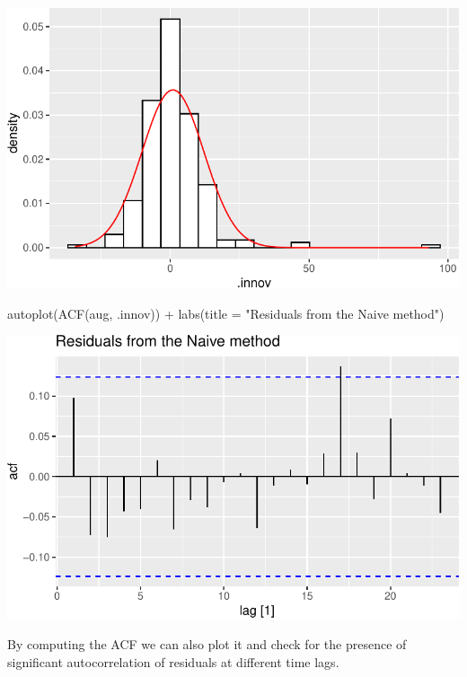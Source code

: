 \documentclass[
  letterpaper,
  DIV=11,
  numbers=noendperiod]{scrartcl}
\newenvironment{Shaded}{\begin{snugshade}}{\end{snugshade}}
\newcommand{\AttributeTok}[1]{\textcolor[rgb]{0.40,0.45,0.13}{#1}}
\newcommand{\FunctionTok}[1]{\textcolor[rgb]{0.28,0.35,0.67}{#1}}
\newcommand{\NormalTok}[1]{\textcolor[rgb]{0.00,0.23,0.31}{#1}}
\newcommand{\SpecialCharTok}[1]{\textcolor[rgb]{0.37,0.37,0.37}{#1}}
\newcommand{\StringTok}[1]{\textcolor[rgb]{0.13,0.47,0.30}{#1}}
\begin{document}
\begin{center}
\includegraphics{chapter5_review_files/figure-pdf/unnamed-chunk-30-1.pdf}
\end{center}

\begin{Shaded}
\begin{Highlighting}[]
\FunctionTok{autoplot}\NormalTok{(}\FunctionTok{ACF}\NormalTok{(aug, .innov)) }\SpecialCharTok{+}
  \FunctionTok{labs}\NormalTok{(}\AttributeTok{title =} \StringTok{"Residuals from the Naive method"}\NormalTok{)}
\end{Highlighting}
\end{Shaded}

\begin{center}
\includegraphics{chapter5_review_files/figure-pdf/unnamed-chunk-31-1.pdf}
\end{center}

By computing the ACF we can also plot it and check for the presence of
significant autocorrelation of residuals at different time lags.
\end{document}
